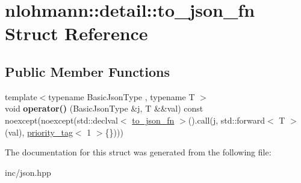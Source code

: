 \hypertarget{structnlohmann_1_1detail_1_1to__json__fn}{}\section{nlohmann\+:\+:detail\+:\+:to\+\_\+json\+\_\+fn Struct Reference}
\label{structnlohmann_1_1detail_1_1to__json__fn}
\subsection*{Public Member Functions}
\begin{DoxyCompactItemize}
\item 
{\footnotesize template$<$typename Basic\+Json\+Type , typename T $>$ }\\void {\bfseries operator()} (Basic\+Json\+Type \&j, T \&\&val) const noexcept(noexcept(std\+::declval$<$ \hyperlink{structnlohmann_1_1detail_1_1to__json__fn}{to\+\_\+json\+\_\+fn} $>$().call(j, std\+::forward$<$ T $>$(val), \hyperlink{structnlohmann_1_1detail_1_1priority__tag}{priority\+\_\+tag}$<$ 1 $>$\{\})))\hypertarget{structnlohmann_1_1detail_1_1to__json__fn_a29dfa4bfda3ac49ea22a76aaf2af6e0c}{}\label{structnlohmann_1_1detail_1_1to__json__fn_a29dfa4bfda3ac49ea22a76aaf2af6e0c}

\end{DoxyCompactItemize}


The documentation for this struct was generated from the following file\+:\begin{DoxyCompactItemize}
\item 
inc/json.\+hpp\end{DoxyCompactItemize}
